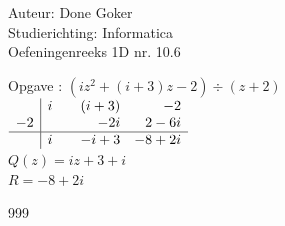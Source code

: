 \documentclass[a4paper]{article}
\begin{document}
  
\noindent \large Auteur: Done Goker \\
\noindent \large Studierichting: Informatica\\
\noindent \large Oefeningenreeks 1D nr. 10.6\\

\medskip

\normalsize


Opgave : $ (iz^2 + (i + 3)z -2) \div (z+2)$ \\

$\begin{array}{r|rrr}
    & i & \quad (i+3) & -2   \\
    -2&   & -2i & 2-6i  \\  \hline
    & i & -i+3 & -8+2i \\
\end{array}$\\

$ Q(z) = iz + 3 + i$\\

$R = -8 + 2i$


\begin{thebibliography}{999}
\end{thebibliography}
\end{document}

